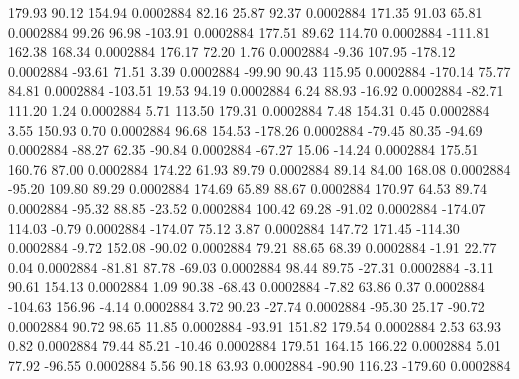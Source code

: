       179.93       90.12      154.94     0.0002884
       82.16       25.87       92.37     0.0002884
      171.35       91.03       65.81     0.0002884
       99.26       96.98     -103.91     0.0002884
      177.51       89.62      114.70     0.0002884
     -111.81      162.38      168.34     0.0002884
      176.17       72.20        1.76     0.0002884
       -9.36      107.95     -178.12     0.0002884
      -93.61       71.51        3.39     0.0002884
      -99.90       90.43      115.95     0.0002884
     -170.14       75.77       84.81     0.0002884
     -103.51       19.53       94.19     0.0002884
        6.24       88.93      -16.92     0.0002884
      -82.71      111.20        1.24     0.0002884
        5.71      113.50      179.31     0.0002884
        7.48      154.31        0.45     0.0002884
        3.55      150.93        0.70     0.0002884
       96.68      154.53     -178.26     0.0002884
      -79.45       80.35      -94.69     0.0002884
      -88.27       62.35      -90.84     0.0002884
      -67.27       15.06      -14.24     0.0002884
      175.51      160.76       87.00     0.0002884
      174.22       61.93       89.79     0.0002884
       89.14       84.00      168.08     0.0002884
      -95.20      109.80       89.29     0.0002884
      174.69       65.89       88.67     0.0002884
      170.97       64.53       89.74     0.0002884
      -95.32       88.85      -23.52     0.0002884
      100.42       69.28      -91.02     0.0002884
     -174.07      114.03       -0.79     0.0002884
     -174.07       75.12        3.87     0.0002884
      147.72      171.45     -114.30     0.0002884
       -9.72      152.08      -90.02     0.0002884
       79.21       88.65       68.39     0.0002884
       -1.91       22.77        0.04     0.0002884
      -81.81       87.78      -69.03     0.0002884
       98.44       89.75      -27.31     0.0002884
       -3.11       90.61      154.13     0.0002884
        1.09       90.38      -68.43     0.0002884
       -7.82       63.86        0.37     0.0002884
     -104.63      156.96       -4.14     0.0002884
        3.72       90.23      -27.74     0.0002884
      -95.30       25.17      -90.72     0.0002884
       90.72       98.65       11.85     0.0002884
      -93.91      151.82      179.54     0.0002884
        2.53       63.93        0.82     0.0002884
       79.44       85.21      -10.46     0.0002884
      179.51      164.15      166.22     0.0002884
        5.01       77.92      -96.55     0.0002884
        5.56       90.18       63.93     0.0002884
      -90.90      116.23     -179.60     0.0002884
